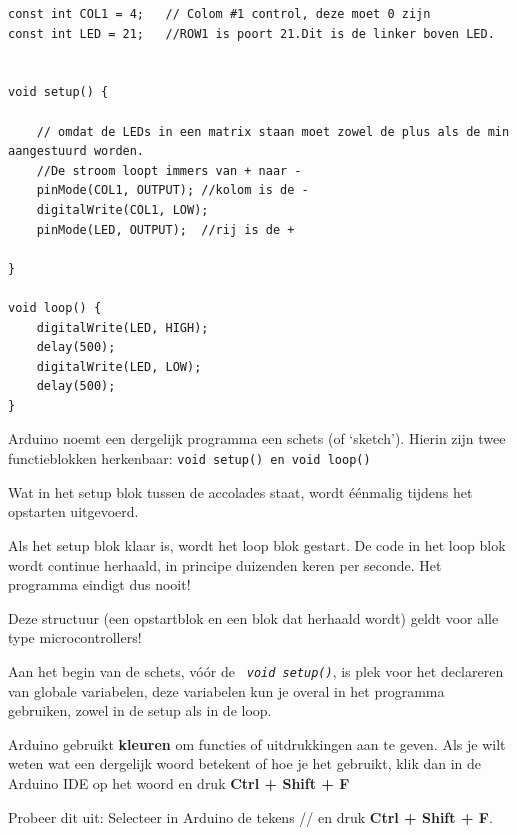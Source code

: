 	


\begin{lstlisting}[caption= Het programma blinkdemo,label={lst:blink},firstnumber=1]		
const int COL1 = 4;   // Colom #1 control, deze moet 0 zijn
const int LED = 21;   //ROW1 is poort 21.Dit is de linker boven LED.


void setup() {
	
	// omdat de LEDs in een matrix staan moet zowel de plus als de min aangestuurd worden.
	//De stroom loopt immers van + naar -
	pinMode(COL1, OUTPUT); //kolom is de -
	digitalWrite(COL1, LOW);
	pinMode(LED, OUTPUT);  //rij is de +
	
}

void loop() {
	digitalWrite(LED, HIGH);
	delay(500);
	digitalWrite(LED, LOW);
	delay(500);
}
\end{lstlisting}

Arduino noemt een dergelijk programma een schets (of ‘sketch’). 
Hierin zijn twee functieblokken herkenbaar: \texttt{{\textcolor{arduinoBlue}{void}} \textcolor{arduinoGreen}{setup}(){} en  \textcolor{arduinoBlue}{void} \textcolor{arduinoGreen}{loop}(){}}

Wat in het setup blok tussen de accolades {} staat, wordt éénmalig tijdens het opstarten uitgevoerd.

Als het setup blok klaar is, wordt het loop blok gestart. De code in het loop blok wordt continue herhaald, in principe duizenden keren per seconde. Het programma eindigt dus nooit!

Deze structuur (een opstartblok en een blok dat herhaald wordt) geldt voor alle type microcontrollers!

Aan het begin van de schets, vóór de \texttt{\textit{ \textcolor{arduinoBlue}{void} \textcolor{arduinoGreen}{setup}()}}, is plek voor het declareren van globale variabelen, deze variabelen kun je overal in het programma gebruiken, zowel in de setup als in de loop.

\colorbox{blue!15}{
	\begin{minipage}{\textwidth}
		Arduino gebruikt \textbf{kleuren} om \textcolor{BurntOrange}{functies} of \textcolor{BlueGreen}{uitdrukkingen} aan te geven. Als je wilt weten wat een dergelijk woord betekent of hoe je het gebruikt, klik dan in de Arduino IDE op het woord en druk 
		\colorbox{mygray}{\textbf{Ctrl + Shift + F}}
		
		Probeer dit uit: Selecteer in Arduino de tekens // en druk \colorbox{mygray}{\textbf{Ctrl + Shift + F}}.

	\end{minipage}
}

